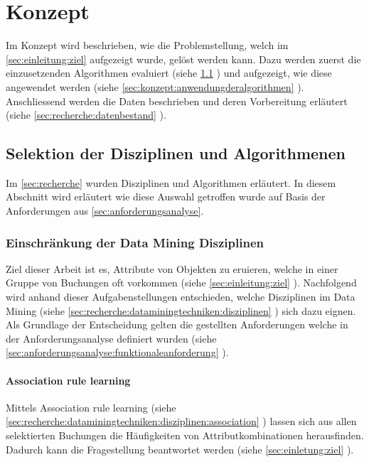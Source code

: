 \chapter{Konzept}
\label{sec:konzept}
Im Konzept wird beschrieben, wie die Problemstellung, welch im \cref{sec:einleitung:ziel} aufgezeigt wurde, gelöst werden kann. Dazu werden zuerst die einzusetzenden Algorithmen evaluiert (siehe \cref{sec:konzept:disziplin-und-algorithmen} ) und aufgezeigt, wie diese angewendet werden (siehe \cref{sec:konzept:anwendungderalgorithmen} ). Anschliessend werden die Daten beschrieben und deren Vorbereitung erläutert (siehe \cref{sec:recherche:datenbestand} ). 

\section{Selektion der Disziplinen und Algorithmenen}
\label{sec:konzept:disziplin-und-algorithmen}
Im \cref{sec:recherche} wurden Disziplinen und Algorithmen erläutert. In diesem Abschnitt wird erläutert wie diese Auswahl getroffen wurde auf Basis der Anforderungen aus \cref{sec:anforderungsanalyse}.

\subsection{Einschränkung der Data Mining Disziplinen}
\label{sec:konzept:disziplinauswahl}
Ziel dieser Arbeit ist es, Attribute von Objekten zu eruieren, welche in einer Gruppe von Buchungen oft vorkommen (siehe \cref{sec:einleitung:ziel} ). Nachfolgend wird anhand dieser Aufgabenstellungen entschieden, welche Disziplinen im Data Mining (siehe \cref{sec:recherche:dataminingtechniken:disziplinen} ) sich dazu eignen. Als Grundlage der Entscheidung gelten die gestellten Anforderungen welche in der Anforderungsanalyse definiert wurden (siehe \cref{sec:anforderungsanalyse:funktionaleanforderung} ).

\subsubsection{Association rule learning}
\label{sec:konzept:disziplinauswahl:association}
Mittels Association rule learning (siehe \cref{sec:recherche:dataminingtechniken:disziplinen:association} ) lassen sich aus allen selektierten Buchungen die Häufigkeiten von Attributkombinationen herausfinden. Dadurch kann die Fragestellung beantwortet werden (siehe \cref{sec:einletung:ziel} ).


